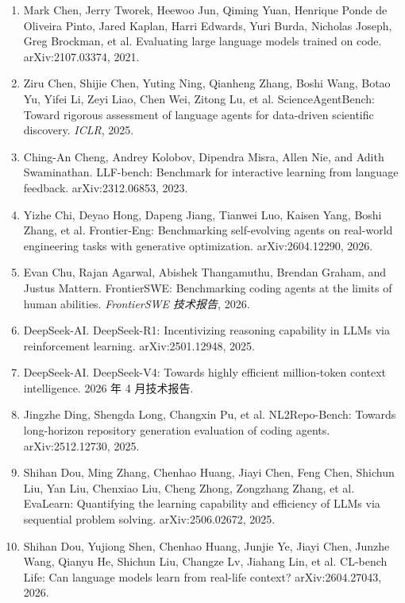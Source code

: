 \begin{enumerate}
\item Mark Chen, Jerry Tworek, Heewoo Jun, Qiming Yuan, Henrique Ponde de Oliveira Pinto, Jared Kaplan, Harri Edwards, Yuri Burda, Nicholas Joseph, Greg Brockman, et al. Evaluating large language models trained on code. arXiv:2107.03374, 2021.

\item Ziru Chen, Shijie Chen, Yuting Ning, Qianheng Zhang, Boshi Wang, Botao Yu, Yifei Li, Zeyi Liao, Chen Wei, Zitong Lu, et al. ScienceAgentBench: Toward rigorous assessment of language agents for data-driven scientific discovery. \textit{ICLR}, 2025.

\item Ching-An Cheng, Andrey Kolobov, Dipendra Misra, Allen Nie, and Adith Swaminathan. LLF-bench: Benchmark for interactive learning from language feedback. arXiv:2312.06853, 2023.

\item Yizhe Chi, Deyao Hong, Dapeng Jiang, Tianwei Luo, Kaisen Yang, Boshi Zhang, et al. Frontier-Eng: Benchmarking self-evolving agents on real-world engineering tasks with generative optimization. arXiv:2604.12290, 2026.

\item Evan Chu, Rajan Agarwal, Abishek Thangamuthu, Brendan Graham, and Justus Mattern. FrontierSWE: Benchmarking coding agents at the limits of human abilities. \textit{FrontierSWE 技术报告}, 2026.

\item DeepSeek-AI. DeepSeek-R1: Incentivizing reasoning capability in LLMs via reinforcement learning. arXiv:2501.12948, 2025.

\item DeepSeek-AI. DeepSeek-V4: Towards highly efficient million-token context intelligence. 2026 年 4 月技术报告.

\item Jingzhe Ding, Shengda Long, Changxin Pu, et al. NL2Repo-Bench: Towards long-horizon repository generation evaluation of coding agents. arXiv:2512.12730, 2025.

\item Shihan Dou, Ming Zhang, Chenhao Huang, Jiayi Chen, Feng Chen, Shichun Liu, Yan Liu, Chenxiao Liu, Cheng Zhong, Zongzhang Zhang, et al. EvaLearn: Quantifying the learning capability and efficiency of LLMs via sequential problem solving. arXiv:2506.02672, 2025.

\item Shihan Dou, Yujiong Shen, Chenhao Huang, Junjie Ye, Jiayi Chen, Junzhe Wang, Qianyu He, Shichun Liu, Changze Lv, Jiahang Lin, et al. CL-bench Life: Can language models learn from real-life context? arXiv:2604.27043, 2026.


\end{enumerate}
